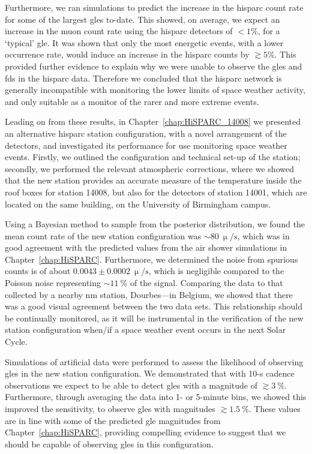 Furthermore, we ran simulations to predict the increase in the \gls{hisparc} count rate for some of the largest \glspl{gle} to-date. This showed, on average, we expect an increase in the muon count rate using the \gls{hisparc} detectors of $<1\%$, for a `typical' \gls{gle}. It was shown that only the most energetic events, with a lower occurrence rate, would induce an increase in the \gls{hisparc} counts by $\gtrsim5\%$. This provided further evidence to explain why we were unable to observe the \glspl{gle} and \glspl{fd} in the \gls{hisparc} data. Therefore we concluded that the \gls{hisparc} network is generally incompatible with monitoring the lower limits of space weather activity, and only suitable as a monitor of the rarer and more extreme events.


Leading on from these results, in Chapter~\ref{chap:HiSPARC_14008} we presented an alternative \gls{hisparc} station configuration, with a novel arrangement of the detectors, and investigated its performance for use monitoring space weather events. Firstly, we outlined the configuration and technical set-up of the station; secondly, we performed the relevant atmospheric corrections, where we showed that the new station provides an accurate measure of the temperature inside the roof boxes for station 14008, but also for the detectors of station 14001, which are located on the same building, on the University of Birmingham campus.

Using a Bayesian method to sample from the posterior distribution, we found the mean count rate of the new station configuration was $\sim80~\upmu/\mathrm{s}$, which was in good agreement with the predicted values from the air shower simulations in Chapter~\ref{chap:HiSPARC}. Furthermore, we determined the noise from spurious counts is of about $0.0043\pm0.0002~\upmu/\mathrm{s}$, which is negligible compared to the Poisson noise representing $\sim11~\%$ of the signal. Comparing the data to that collected by a nearby \gls{nm} station, Dourbes---in Belgium, we showed that there was a good visual agreement between the two data sets. This relationship should be continually monitored, as it will be instrumental in the verification of the new station configuration when/if a space weather event occurs in the next Solar Cycle.

Simulations of artificial data were performed to assess the likelihood of observing \glspl{gle} in the new station configuration. We demonstrated that with 10-s cadence observations we expect to be able to detect \glspl{gle} with a magnitude of $\gtrsim3~\%$. Furthermore, through averaging the data into 1- or 5-minute bins, we showed this improved the sensitivity, to observe \glspl{gle} with magnitudes $\gtrsim1.5~\%$. These values are in line with some of the predicted \gls{gle} magnitudes from Chapter~\ref{chap:HiSPARC}, providing compelling evidence to suggest that we should be capable of observing \glspl{gle} in this configuration.

